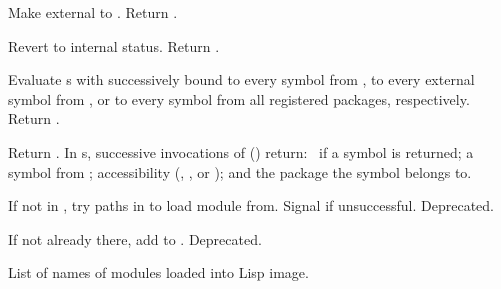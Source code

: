 \begin{LIST}{1cm}
  {
  Make  external to . Return \retval{\T}.
  }

  {
  Revert  to internal status. Return \retval{\T}.
  }
  
  {
  Evaluate s with  successively bound to every
  symbol from , to every external symbol from
  , or to every symbol from all registered packages, 
  respectively. Return . 
  }

  {
  Return . In s, successive
  invocations of  () return: \T\ if a symbol is returned;
  a symbol from ; accessibility
  (, , or ); and the
  package the symbol belongs to.
  }

  {
  If not in , try paths in  to load
  module from. Signal  if unsuccessful. Deprecated.
  }

  {
  If not already there, add  to
  . Deprecated. 
  }

  {
  List of names of modules loaded into Lisp image.
  }

\end{LIST}



